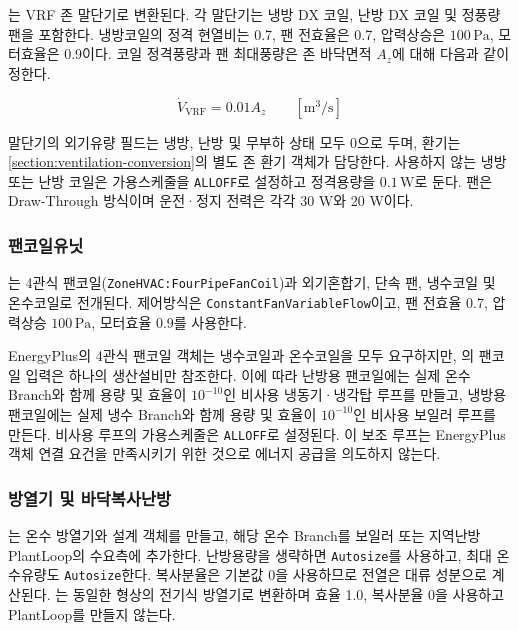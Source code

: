 는 VRF 존 말단기로 변환된다. 각 말단기는 냉방 DX 코일, 난방 DX 코일 및 정풍량 팬을 포함한다. 냉방코일의 정격 현열비는 0.7, 팬 전효율은 0.7, 압력상승은 $100\,\mathrm{Pa}$, 모터효율은 0.9이다. 코일 정격풍량과 팬 최대풍량은 존 바닥면적 $A_z$에 대해 다음과 같이 정한다.

\begin{equation}
  \dot V_{\mathrm{VRF}} = 0.01 A_z \qquad [\mathrm{m^3/s}]
  \label{eq:vrf-terminal-airflow}
\end{equation}

말단기의 외기유량 필드는 냉방, 난방 및 무부하 상태 모두 0으로 두며, 환기는 \cref{section:ventilation-conversion}의 별도 존 환기 객체가 담당한다. 사용하지 않는 냉방 또는 난방 코일은 가용스케줄을 \texttt{ALLOFF}로 설정하고 정격용량을 $0.1\,\mathrm{W}$로 둔다. 팬은 Draw-Through 방식이며 운전·정지 전력은 각각 30 W와 20 W이다.

\subsubsection{팬코일유닛}

는 4관식 팬코일(\texttt{ZoneHVAC:FourPipeFanCoil})과 외기혼합기, 단속 팬, 냉수코일 및 온수코일로 전개된다. 제어방식은 \texttt{ConstantFanVariableFlow}이고, 팬 전효율 0.7, 압력상승 $100\,\mathrm{Pa}$, 모터효율 0.9를 사용한다.

EnergyPlus의 4관식 팬코일 객체는 냉수코일과 온수코일을 모두 요구하지만, \simulator 의 팬코일 입력은 하나의 생산설비만 참조한다. 이에 따라 난방용 팬코일에는 실제 온수 Branch와 함께 용량 및 효율이 $10^{-10}$인 비사용 냉동기·냉각탑 루프를 만들고, 냉방용 팬코일에는 실제 냉수 Branch와 함께 용량 및 효율이 $10^{-10}$인 비사용 보일러 루프를 만든다. 비사용 루프의 가용스케줄은 \texttt{ALLOFF}로 설정된다. 이 보조 루프는 EnergyPlus 객체 연결 요건을 만족시키기 위한 것으로 에너지 공급을 의도하지 않는다.

\subsubsection{방열기 및 바닥복사난방}

는 온수 방열기와 설계 객체를 만들고, 해당 온수 Branch를 보일러 또는 지역난방 PlantLoop의 수요측에 추가한다. 난방용량을 생략하면 \texttt{Autosize}를 사용하고, 최대 온수유량도 \texttt{Autosize}한다. 복사분율은 기본값 0을 사용하므로 전열은 대류 성분으로 계산된다. 는 동일한 형상의 전기식 방열기로 변환하며 효율 1.0, 복사분율 0을 사용하고 PlantLoop를 만들지 않는다.


